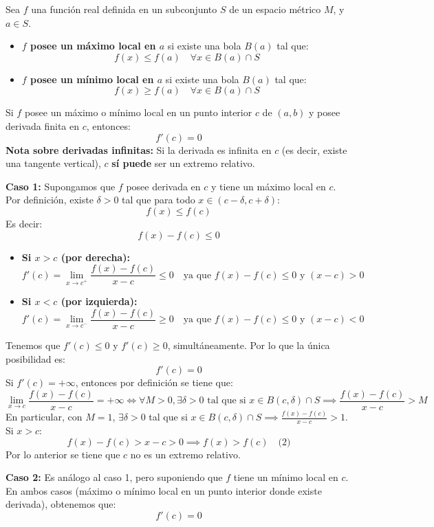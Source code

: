 \begin{definicion}
   Sea $f$ una función real definida en un subconjunto $S$ de un espacio métrico $M$, y $a \in S$.

\begin{itemize}
    \item \textbf{$f$ posee un máximo local en $a$} si existe una bola $B(a)$ tal que:
    \[f(x) \le f(a) \quad \forall x \in B(a) \cap S\]
    
    \item \textbf{$f$ posee un mínimo local en $a$} si existe una bola $B(a)$ tal que:
    \[f(x) \ge f(a) \quad \forall x \in B(a) \cap S\]
\end{itemize}
\end{definicion}
\begin{teorema}
    Si $f$ posee un máximo o mínimo local en un punto interior $c$ de $(a, b)$ y posee derivada finita en $c$, entonces:
\[f'(c) = 0\]
\textbf{Nota sobre derivadas infinitas:} Si la derivada es infinita en $c$ (es decir, existe una tangente vertical), $c$ \textbf{sí puede} ser un extremo relativo.
\end{teorema}
\begin{prueba}
    \textbf{Caso 1:} Supongamos que $f$ posee derivada en $c$ y tiene un máximo local en $c$.
Por definición, existe $\delta > 0$ tal que para todo $x \in (c-\delta, c+\delta)$:
    \[f(x) \le f(c)\]
Es decir:
\[f(x) - f(c) \le 0\]

\begin{itemize}
    \item \textbf{Si $x > c$ (por derecha):}
    \[f'(c) = \lim_{x \to c^+} \frac{f(x) - f(c)}{x-c} \le 0 \quad \text{ya que } f(x)-f(c) \le 0 \text{ y } (x-c) > 0\]
    
    \item \textbf{Si $x < c$ (por izquierda):}
    \[f'(c) = \lim_{x \to c^-} \frac{f(x) - f(c)}{x-c} \ge 0 \quad \text{ya que } f(x)-f(c) \le 0 \text{ y } (x-c) < 0\]
\end{itemize}

Tenemos que $f'(c) \le 0$ y $f'(c) \ge 0$, simultáneamente.
Por lo que la única posibilidad es:
\[f'(c) = 0\]
Si $f'(c) = +\infty$, entonces por definición se tiene que:
\[\lim_{x \to c} \frac{f(x) - f(c)}{x - c} = +\infty \iff \forall M > 0, \exists \delta > 0 \text{ tal que si } x \in B(c, \delta) \cap S \implies \frac{f(x) - f(c)}{x - c} > M\]
En particular, con $M = 1$, $\exists \delta > 0$ tal que si $x \in B(c, \delta) \cap S \implies \frac{f(x) - f(c)}{x - c} > 1$.
Si $x > c$:
\[f(x) - f(c) > x - c > 0 \implies f(x) > f(c) \quad \text{(2)}\]
Por lo anterior se tiene que $c$ no es un extremo relativo.

\textbf{Caso 2:} Es análogo al caso 1, pero suponiendo que $f$ tiene un mínimo local en $c$.
En ambos casos (máximo o mínimo local en un punto interior donde existe derivada), obtenemos que:
\[f'(c) = 0\]
\end{prueba}
